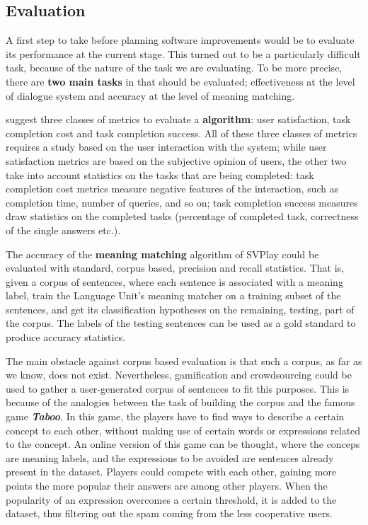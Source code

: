 \subsection{Evaluation} \label{ch:conclusions:fw:eval}
A first step to take before planning software improvements would be to evaluate its performance at the current stage. This turned out to be a particularly difficult task, because of the nature of the task we are evaluating. To be more precise, there are \textbf{two main tasks} in \pname that should be evaluated; effectiveness at the level of dialogue system and accuracy at the level of meaning matching.

\cite{Jurafsky} suggest three classes of metrics to evaluate a \textbf{algorithm}: user satisfaction, task completion cost and task completion success. All of these three classes of metrics requires a study based on the user interaction with the system; while user satisfaction metrics are based on the subjective opinion of users, the other two take into account statistics on the tasks that are being completed: task completion cost metrics measure negative features of the interaction, such as completion time, number of queries, and so on; task completion success measures draw statistics on the completed tasks (percentage of completed task, correctness of the single answers etc.).
 
The accuracy of the \textbf{meaning matching} algorithm of SVPlay could be evaluated with standard, corpus based, precision and recall statistics. That is, given a corpus of sentences, where each sentence is associated with a meaning label, train the Language Unit's meaning matcher on a training subset of the sentences, and get its classification hypotheses on the remaining, testing, part of the corpus. The labels of the testing sentences can be used as a gold standard to produce accuracy statistics.

The main obstacle against corpus based evaluation is that such a corpus, as far as we know, does not exist. Nevertheless, gamification and crowdsourcing could be used to gather a user-generated corpus of sentences to fit this purposes. This is because of the analogies between the task of building the corpus and the famous game \textbf{\textit{Taboo}}. In this game, the players have to find ways to describe a certain concept to each other, without making use of certain words or expressions related to the concept. An online version of this game can be thought, where the conceps are meaning labels, and the expressions to be avoided are sentences already present in the dataset. Players could compete with each other, gaining more points the more popular their answers are among other players. When the popularity of an expression overcomes a certain threshold, it is added to the dataset, thus filtering out the spam coming from the less cooperative users.


